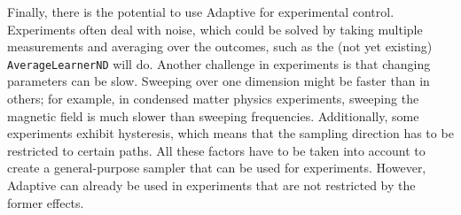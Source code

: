 Finally, there is the potential to use Adaptive for experimental control.
Experiments often deal with noise, which could be solved by taking multiple measurements and averaging over the outcomes, such as the (not yet existing) \passthrough{\lstinline!AverageLearnerND!} will do.
Another challenge in experiments is that changing parameters can be slow.
Sweeping over one dimension might be faster than in others; for example, in condensed matter physics experiments, sweeping the magnetic field is much slower than sweeping frequencies.
Additionally, some experiments exhibit hysteresis, which means that the sampling direction has to be restricted to certain paths.
All these factors have to be taken into account to create a general-purpose sampler that can be used for experiments.
However, Adaptive can already be used in experiments that are not restricted by the former effects.

